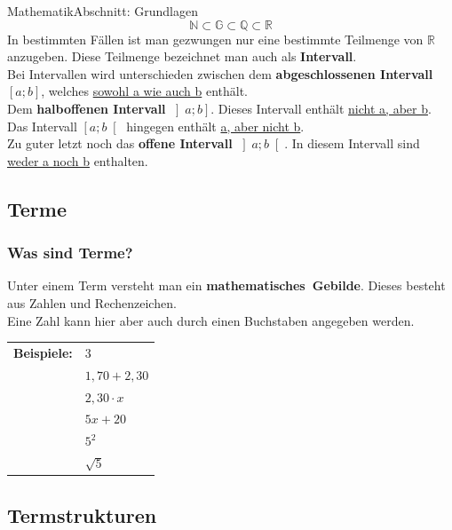 \documentclass[11pt,twocolumn,oneside,openany,headings=optiontotoc,11pt,numbers=noenddot]{article}
\begin{document}
\begin{worksheet}{}{Mathematik}{Abschnitt: Grundlagen}
		\[\mathbb{N} \subset \mathbb{G} \subset \mathbb{Q} \subset \mathbb{R}\]
		In bestimmten Fällen ist man gezwungen nur eine bestimmte Teilmenge von \(\mathbb{R}\) anzugeben. Diese Teilmenge bezeichnet man auch als \textbf{Intervall}.\\
		Bei Intervallen wird unterschieden zwischen dem \textbf{abgeschlossenen Intervall} \(\left[a;b\right]\), welches \underline{sowohl a wie auch b} enthält.\\
		Dem \textbf{halboffenen Intervall} \(\left]a;b\right]\). Dieses Intervall enthält \underline{nicht a, aber b}. Das Intervall \(\left[a;b\right[\) hingegen enthält \underline{a, aber nicht b}.\\
		Zu guter letzt noch das \textbf{offene Intervall} \(\left]a;b\right[\). In diesem Intervall sind \underline{weder a noch b} enthalten.
		\subsection{Terme}
		\subsubsection*{Was sind Terme?} Unter einem Term versteht man ein \mbox{\textbf{mathematisches Gebilde}}. Dieses besteht aus Zahlen und Rechenzeichen.\\
		Eine Zahl kann hier aber auch durch einen Buchstaben angegeben werden.\\
		\par
		\begin{tabularx}{0.5\textwidth}{ll}
			\noindent
			\textbf{Beispiele:} & \(3\)\\
			& \(1,70+2,30\)\\
			& \(2,30\cdot x\)\\
			& \(5x + 20\)\\
			& \(5^2\)\\
			& \(\sqrt{5}\)\\
		\end{tabularx}
		\subsection{Termstrukturen}

\end{worksheet}
\end{document}
